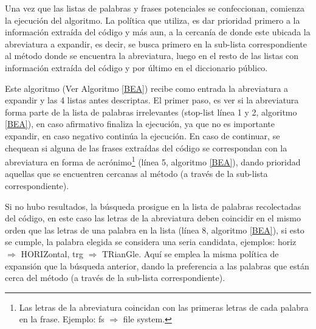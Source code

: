 Una vez que las listas de palabras y frases potenciales se confeccionan, comienza la ejecución del algoritmo. La política que utiliza, es dar prioridad primero a la información extraída del código y más aun, a la cercanía de donde este ubicada la abreviatura a expandir, es decir, se busca primero en la sub-lista correspondiente al método donde se encuentra la abreviatura, luego en el resto de las listas con información extraída del código y por último en el diccionario público.

Este algoritmo (Ver Algoritmo \ref{BEA}) recibe como entrada la abreviatura a expandir y las 4 listas antes descriptas. El primer paso, es ver si la abreviatura forma parte de la lista de palabras irrelevantes (stop-list línea 1 y 2, algoritmo \ref{BEA}), en caso afirmativo finaliza la ejecución, ya que no es importante expandir, en caso negativo continúa la ejecución. En caso de continuar, se chequean si alguna de las frases extraídas del código se correspondan con la abreviatura en forma de acrónimo\footnote[1]{Las letras de la abreviatura coincidan con las primeras letras de cada palabra en la frase. Ejemplo: fs $\Rightarrow$ file system.} (línea 5, algoritmo \ref{BEA}), dando prioridad aquellas que se encuentren cercanas al método (a través de la sub-lista correspondiente).

Si no hubo resultados, la búsqueda prosigue en la lista de palabras recolectadas del código, en este caso las letras de la abreviatura deben coincidir en el mismo orden que las letras de una palabra en la lista (línea 8, algoritmo \ref{BEA}), si esto se cumple, la palabra elegida se considera una seria candidata, ejemplos: \mbox{\textsf{horiz}} $\Rightarrow$ HORIZ\textsf{ontal}, \textsf{trg} $\Rightarrow$ TR\textsf{ian}G\textsf{le}. Aquí se emplea la misma política de expansión que la búsqueda anterior, dando la preferencia a las palabras que están cerca del método (a través de la sub-lista correspondiente). 


